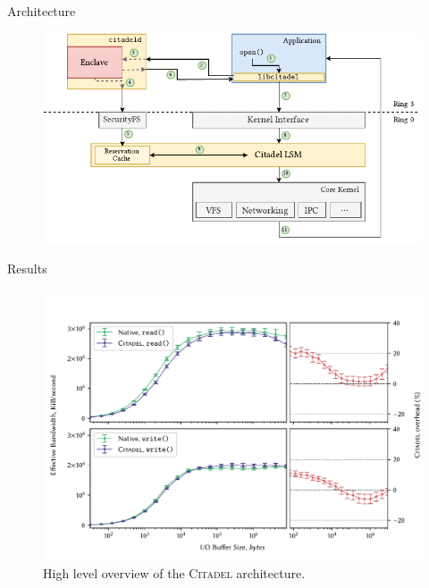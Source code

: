 \documentclass[xcolor=dvipsnames]{beamer}
\begin{document}
\begin{frame}{Architecture}
\begin{figure}[]
    \centering
    \includegraphics[width=\linewidth]{../figures/OverallArchitecture.pdf}
    \label{fig:citadel-overview}
\end{figure}
\end{frame}



\begin{frame}{Results}
    \begin{figure}[]
        \centering
        \includegraphics[width=0.9\linewidth]{../figures/graphs/io.pdf}
        \vspace{3mm}
        \caption{High level overview of the \textsc{Citadel} architecture.}
        \label{fig:citadel-overview}
    \end{figure}
\end{frame}
\end{document}
